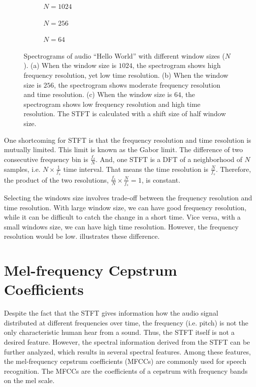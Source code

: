 \documentclass[12pt,final,twoside]{report}
\theoremstyle{plain}
\theoremstyle{definition}
\theoremstyle{remark}
\newcommand{\includetexfig}[1]{}
\begin{document}
\begin{figure}[t]
  \centering
  \begin{subfigure}[b]{.8\textwidth}
    \includetexfig{spec1024}
    \caption{$N=1024$}
    \label{fig:spec1024}
  \end{subfigure}

  \begin{subfigure}[b]{.8\textwidth}
    \includetexfig{spec256}
    \caption{$N=256$}
    \label{fig:spec256}
  \end{subfigure}

  \begin{subfigure}[b]{.8\textwidth}
    \includetexfig{spec64}
    \caption{$N=64$}
    \label{fig:spec64}
  \end{subfigure}

  \caption[Spectrograms with different window sizes]{Spectrograms of audio ``Hello World'' with different window sizes ($N$). (a) When the window size is $1024$, the spectrogram shows high frequency resolution, yet low time resolution.
(b) When the window size is $256$, the spectrogram shows moderate frequency resolution and time resolution.
(c) When the window size is $64$, the spectrogram shows low frequency resolution and high time resolution.
  The STFT is calculated with a shift size of half window size. }
  \label{fig:spec}
\end{figure}

One shortcoming for STFT is that the frequency resolution and time resolution is mutually limited. This limit is known as the Gabor limit. The difference of two consecutive frequency bin is $\frac{f_s}{N}$. And, one STFT is a DFT of a neighborhood of $N$ samples, i.e. $N \times \frac{1}{f_s}$ time interval. That means the time resolution is $\frac{N}{f_s}$. Therefore, the product of the two resolutions, $\frac{f_s}{N} \times \frac{N}{f_s} = 1$, is constant. 

Selecting the windows size involves trade-off between the frequency resolution and time resolution. With large window size, we can have good frequency resolution, while it can be difficult to catch the change in a short time. Vice versa, with a small windows size, we can have high time resolution. However, the frequency resolution would be low.  illustrates these difference.

\section{Mel-frequency Cepstrum Coefficients}
Despite the fact that the STFT gives information how the audio signal distributed at different frequencies over time, the frequency (i.e. pitch) is not the only characteristic human hear from a sound. Thus, the STFT itself is not a desired feature. However, the spectral information derived from the STFT can be further analyzed, which results in several spectral features. Among these features, the mel-frequency cepstrum coefficients (MFCCs) are commonly used for speech recognition.
The MFCCs are the coefficients of a cepstrum with frequency bands on the mel scale.
\end{document}
